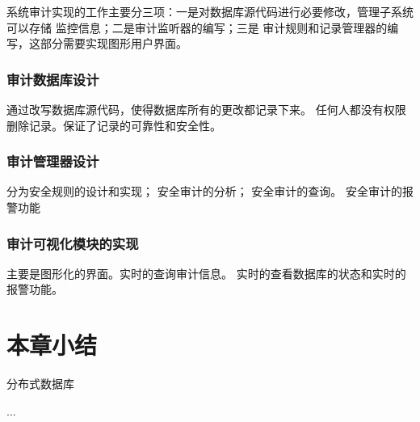 系统审计实现的工作主要分三项：一是对数据库源代码进行必要修改，管理子系统可以存储
监控信息；二是审计监听器的编写；三是
审计规则和记录管理器的编写，这部分需要实现图形用户界面。
\subsubsection*{审计数据库设计}
通过改写数据库源代码，使得数据库所有的更改都记录下来。
任何人都没有权限删除记录。保证了记录的可靠性和安全性。
\subsubsection*{审计管理器设计}
分为安全规则的设计和实现；
安全审计的分析；
安全审计的查询。
安全审计的报警功能
\subsubsection*{审计可视化模块的实现}
主要是图形化的界面。实时的查询审计信息。
实时的查看数据库的状态和实时的报警功能。
\section{本章小结}
分布式数据库

...